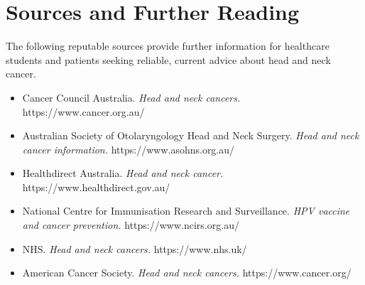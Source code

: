 \section*{Sources and Further Reading}
The following reputable sources provide further information for healthcare students and patients seeking reliable, current advice about head and neck cancer.

\begin{itemize}
    \item Cancer Council Australia. \textit{Head and neck cancers.} https://www.cancer.org.au/
    \item Australian Society of Otolaryngology Head and Neck Surgery. \textit{Head and neck cancer information.} https://www.asohns.org.au/
    \item Healthdirect Australia. \textit{Head and neck cancer.} https://www.healthdirect.gov.au/
    \item National Centre for Immunisation Research and Surveillance. \textit{HPV vaccine and cancer prevention.} https://www.ncirs.org.au/
    \item NHS. \textit{Head and neck cancers.} https://www.nhs.uk/
    \item American Cancer Society. \textit{Head and neck cancers.} https://www.cancer.org/
\end{itemize}
